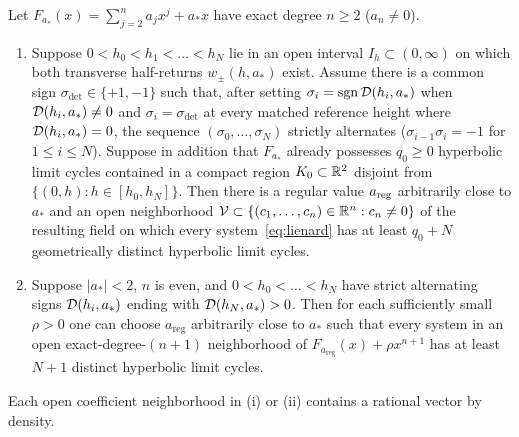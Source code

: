 \begin{proposition}\label{prop:sard}
Let $F_{a_*}(x)=\sum_{j=2}^n a_j x^j + a_* x$ have exact degree $n\ge 2$ ($a_n\neq 0$).
\begin{enumerate}
  \item[\textup{(i)}] Suppose $0<h_0<h_1<\dots<h_N$ lie in an open interval $I_h\subset(0,\infty)$ on which both transverse half-returns $w_\pm(h,a_*)$ exist. Assume there is a common sign $\sigma_{\mathrm{det}}\in\{+1,-1\}$ such that, after setting $\sigma_i=\operatorname{sgn}\mathcal{D}(h_i,a_*)$ when $\mathcal{D}(h_i,a_*)\neq 0$ and $\sigma_i=\sigma_{\mathrm{det}}$ at every matched reference height where $\mathcal{D}(h_i,a_*)=0$, the sequence $(\sigma_0,\dots,\sigma_N)$ strictly alternates ($\sigma_{i-1}\sigma_i=-1$ for $1\le i\le N$). Suppose in addition that $F_{a_*}$ already possesses $q_0\ge 0$ hyperbolic limit cycles contained in a compact region $K_0\subset\mathbb{R}^2$ disjoint from $\{(0,h):h\in[h_0,h_N]\}$. Then there is a regular value $a_{\rm reg}$ arbitrarily close to $a_*$ and an open neighborhood $\mathcal{V}\subset\{(c_1,\dots,c_n)\in\mathbb{R}^n:c_n\neq 0\}$ of the resulting field on which every system~\eqref{eq:lienard} has at least $q_0+N$ geometrically distinct hyperbolic limit cycles.
  \item[\textup{(ii)}] Suppose $|a_*|<2$, $n$ is even, and $0<h_0<\dots<h_N$ have strict alternating signs $\mathcal{D}(h_i,a_*)$ ending with $\mathcal{D}(h_N,a_*)>0$. Then for each sufficiently small $\rho>0$ one can choose $a_{\mathrm{reg}}$ arbitrarily close to $a_*$ such that every system in an open exact-degree-$(n+1)$ neighborhood of $F_{a_{\mathrm{reg}}}(x)+\rho x^{n+1}$ has at least $N+1$ distinct hyperbolic limit cycles.
\end{enumerate}
Each open coefficient neighborhood in \textup{(i)} or \textup{(ii)} contains a rational vector by density.
\end{proposition}


